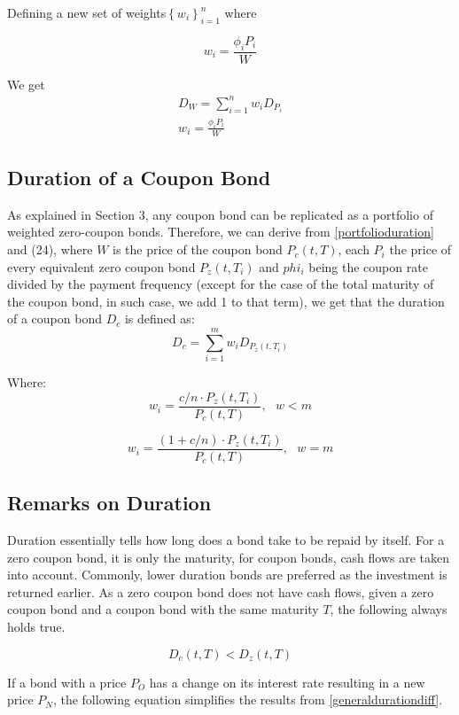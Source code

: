 \documentclass[10pt,letterpaper]{article}
\begin{document}
Defining a new set of weights$\left\lbrace w_i\right\rbrace_{i=1}^n$ where 

$$w_i = \frac{\phi_i P_i}{W}$$

We get
\begin{eqnarray}\label{portfolioduration}
D_W  = \sum_{i=1}^n w_i D_{P_i}\\w_i = \frac{\phi_i P_i}{W}
\end{eqnarray}

\subsection{Duration of a Coupon Bond}

As explained in Section 3, any coupon bond can be replicated as a portfolio of weighted zero-coupon bonds. Therefore, we can derive from \eqref{portfolioduration} and (24), where $W$ is the price of the coupon bond $P_c(t,T)$, each $P_i$ the price of every equivalent zero coupon bond $P_z(t, T_i)$ and $phi_i$ being the coupon rate divided by the payment frequency (except for the case of the total maturity of the coupon bond, in such case, we add 1 to that term), we get that the duration of a coupon bond $D_c$ is defined as:
\begin{equation}\label{couponduration}
D_c  = \sum_{i=1}^m w_i D_{P_z(t, T_i)}
\end{equation}

Where:
$$
w_i = \frac{c/n \cdot P_z(t, T_i)}{P_c(t, T)},\mbox{  }w < m
$$

$$
w_i = \frac{(1 + c/n) \cdot P_z(t, T_i)}{P_c(t, T)},\mbox{  }w = m
$$

\subsection{Remarks on Duration}

Duration essentially tells how long does a bond take to be repaid by itself. For a zero coupon bond, it is only the maturity, for coupon bonds, cash flows are taken into account. Commonly, lower duration bonds are preferred as the investment is returned earlier. As a zero coupon bond does not have cash flows, given a zero coupon bond and a coupon bond with the same maturity $T$, the following always holds true.

$$D_c(t, T) < D_z(t, T)$$

If a bond with a price $P_O$ has a change on its interest rate resulting in a new price $P_N$, the following equation simplifies the results from \eqref{generaldurationdiff}.
\end{document}

